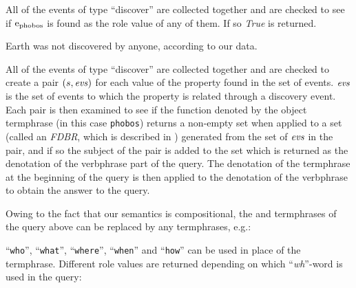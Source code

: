 \documentclass[../main.tex]{subfiles}
\begin{document}
\begin{refsection}

\examplespacing

\noindent All of the events of type ``discover'' are collected together and are checked to see if $\mathrm{e}_{\operatorname{phobos}}$ is found as the  role value of any of them. If so \textit{True} is returned.

\examplespacing


\examplespacing

\noindent Earth was not discovered by anyone, according to our data.

\examplespacing


\examplespacing

\noindent All of the events of type ``discover'' are collected together and are checked to create a pair $(s, \operatorname{\mathit{evs}})$ for each value of the  property found in the set of events. $\operatorname{\mathit{evs}}$ is the set of events to which the  property is related through a discovery event.  Each pair is then examined to see if the function denoted by the object termphrase (in this case \texttt{phobos}) returns a non-empty set when applied to a set (called an \textit{FDBR}, which is described in ) generated from the set of $\operatorname{\mathit{evs}}$ in the pair, and if so the subject of the pair is added to the set which is returned as the denotation of the verbphrase part of the query. The denotation of the termphrase at the beginning of the query is then applied to the denotation of the verbphrase to obtain the answer to the query. %

Owing to the fact that our semantics is compositional, the  and  termphrases of the query above can be replaced by any termphrases, e.g.:

\examplespacing



\examplespacing

\noindent ``\texttt{who}'', ``\texttt{what}'', ``\texttt{where}'', ``\texttt{when}'' and ``\texttt{how}'' can be used in place of the  termphrase. Different role values are returned depending on which ``\textit{wh}''-word is used in the query:


\end{refsection}
\end{document}
